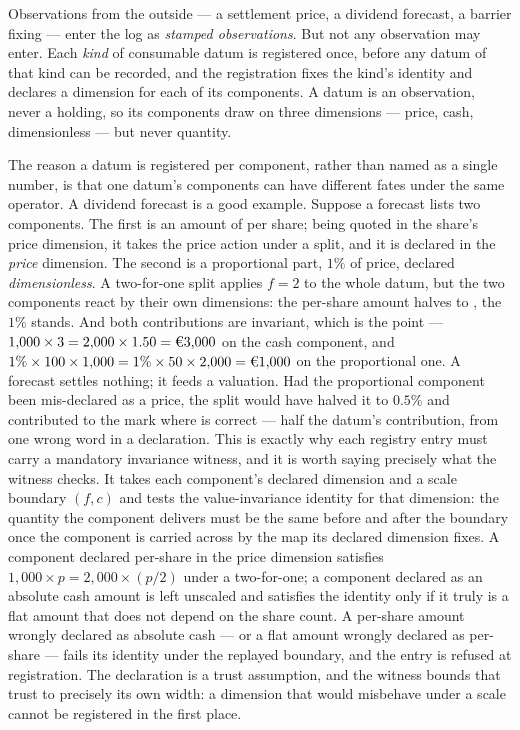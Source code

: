 Observations from the outside --- a settlement price, a dividend forecast, a
barrier fixing --- enter the log as \emph{stamped observations}. But not any
observation may enter. Each \emph{kind} of consumable datum is registered once,
before any datum of that kind can be recorded, and the registration fixes the
kind's identity and declares a dimension for each of its components. A datum is an
observation, never a holding, so its components draw on three dimensions --- price,
cash, dimensionless --- but never quantity.

The reason a datum is registered per component, rather than named as a single
number, is that one datum's components can have different fates under the same
operator. A dividend forecast is a good example. Suppose a forecast lists two
components. The first is an amount of  per share; being quoted in the share's price
dimension, it takes the price action under a split, and it is declared in the
\emph{price} dimension. The second is a proportional part, $1\%$ of price, declared
\emph{dimensionless}. A two-for-one split applies $f = 2$ to the whole datum, but
the two components react by their own dimensions: the per-share amount halves to
, the $1\%$ stands. And both contributions are invariant, which is the
point ---
$1{,}000 \times 3 = 2{,}000 \times 1.50 = \EUR{3{,}000}$ on the cash component, and
$1\% \times 100 \times 1{,}000 = 1\% \times 50 \times 2{,}000 = \EUR{1{,}000}$ on
the proportional one. A forecast settles nothing; it feeds a valuation. Had the
proportional component been mis-declared as a price, the split would have halved it to
$0.5\%$ and contributed  to the mark where  is correct ---
half the datum's contribution, from one wrong word in a declaration. This is
exactly why each registry entry must carry a mandatory invariance witness, and it
is worth saying precisely what the witness checks. It takes each component's
declared dimension and a scale boundary $(f, c)$ and tests the value-invariance
identity for that dimension: the quantity the component delivers must be the same
before and after the boundary once the component is carried across by the map its
declared dimension fixes. A component declared per-share in the price dimension
satisfies $1{,}000 \times p = 2{,}000 \times (p/2)$ under a two-for-one; a component
declared as an absolute cash amount is left unscaled and satisfies the identity only
if it truly is a flat amount that does not depend on the share count. A per-share
amount wrongly declared as absolute cash --- or a flat amount wrongly declared as
per-share --- fails its identity under the replayed boundary, and the entry is
refused at registration. The declaration is a trust assumption, and the witness
bounds that trust to precisely its own width: a dimension that would misbehave under
a scale cannot be registered in the first place.

